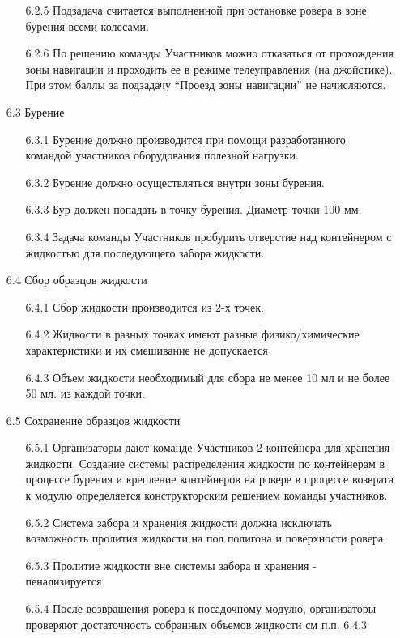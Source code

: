 \begin{enumerate}
\begin{enumerate}
        \item[6.2.5] Подзадача считается выполненной при остановке ровера в зоне бурения всеми колесами.
        \item[6.2.6] По решению команды Участников можно отказаться от прохождения зоны навигации и проходить ее в режиме телеуправления (на джойстике). При этом баллы за подзадачу “Проезд зоны навигации” не начисляются.
    \end{enumerate}
    \item[6.3] Бурение
    \begin{enumerate}
        \item[6.3.1] Бурение должно производится при помощи разработанного командой участников оборудования полезной нагрузки.
        \item[6.3.2] Бурение должно осуществляться внутри зоны бурения.
        \item[6.3.3] Бур должен попадать в точку бурения. Диаметр точки 100 мм.
        \item[6.3.4] Задача команды Участников пробурить отверстие над контейнером с жидкостью для последующего забора жидкости.
    \end{enumerate}
    \item[6.4] Сбор образцов жидкости
    \begin{enumerate}
        \item[6.4.1] Сбор жидкости производится из 2-х точек. 
        \item[6.4.2] Жидкости в разных точках имеют разные физико/химические характеристики и их смешивание не допускается
        \item[6.4.3] Объем жидкости необходимый для сбора не менее 10 мл и не более 50 мл. из каждой точки.
    \end{enumerate} 
    \item[6.5] Сохранение образцов жидкости
    \begin{enumerate} 
        \item[6.5.1] Организаторы дают команде Участников 2 контейнера для хранения жидкости. Создание системы распределения жидкости по контейнерам в процессе бурения и крепление контейнеров на ровере в процессе возврата к модулю определяется конструкторским решением команды участников. 
        \item[6.5.2] Система забора и хранения жидкости должна исключать возможность пролития жидкости на пол полигона и поверхности ровера
        \item[6.5.3] Пролитие жидкости вне системы забора и хранения - пенализируется
        \item[6.5.4] После возвращения ровера к посадочному модулю, организаторы проверяют достаточность собранных объемов жидкости см п.п. 6.4.3
    \end{enumerate}
\end{enumerate}

